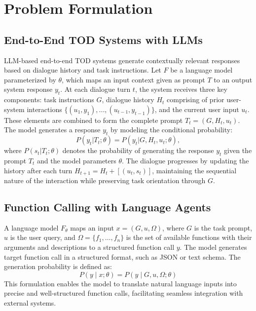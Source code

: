 \section{Problem Formulation}
\label{app: problem-formulation}

\subsection{End-to-End TOD Systems with LLMs} LLM-based end-to-end TOD systems generate contextually relevant responses based on dialogue history and task instructions. Let $F$ be a language model parameterized by $\theta$, which maps an input context given as prompt $T$ to an output system response $y_t$. At each dialogue turn $t$, the system receives three key components: task instructions $G$, dialogue history $H_t$ comprising of prior user-system interactions $\{(u_1, y_1), ..., (u_{t-1}, y_{t-1})\}$, and the current user input $u_t$. These elements are combined to form the complete prompt $T_t = (G, H_t, u_t)$. The model generates a response $y_t$ by modeling the conditional probability:
\begin{equation}
    P(y_t|T_t; \theta) = P(y_t|G, H_t, u_t; \theta),
\end{equation}
where $P(s_t|T_t; \theta)$ denotes the probability of generating the response $y_t$ given the prompt $T_t$ and the model parameters $\theta$. The dialogue progresses by updating the history after each turn $H_{t+1} = H_t + {[(u_t, s_t)]}$, maintaining the sequential nature of the interaction while preserving task orientation through $G$.

\subsection{Function Calling with Language Agents} A language model $F_\theta$ maps an input $x = (G, u, \Omega)$, where $G$ is the task prompt, $u$ is the user query, and $\Omega = \{f_1, \dots, f_n\}$ is the set of available functions with their arguments and descriptions to a structured function call $y$. The model generates target function call in a structured format, such as JSON or text schema. The generation probability is defined as:
\begin{equation}
P(y \mid x; \theta) = P(y \mid G, u, \Omega; \theta)
\end{equation}
This formulation enables the model to translate natural language inputs into precise and well-structured function calls, facilitating seamless integration with external systems.

